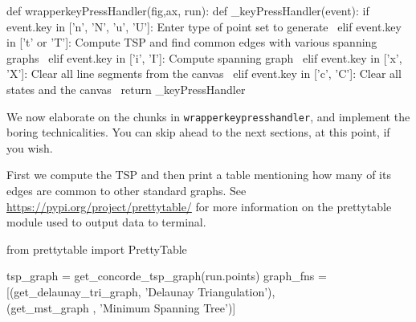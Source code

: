 \nwenddocs{}\plusendmoddef\nwstartdeflinemarkup{}\nwenddeflinemarkup
def wrapperkeyPressHandler(fig,ax, run): 
       def _keyPressHandler(event):
               if event.key in ['n', 'N', 'u', 'U']: 
                     \LA{}Enter type of point set to generate~{\nwtagstyle{}}\RA{}                   
               elif event.key in ['t' or 'T']:
                     \LA{}Compute TSP and find common edges with various spanning graphs~{\nwtagstyle{}}\RA{}
               elif event.key in ['i', 'I']:                     
                     \LA{}Compute spanning graph~{\nwtagstyle{}}\RA{}    
               elif event.key in ['x', 'X']:
                     \LA{}Clear all line segments from the canvas~{\nwtagstyle{}}\RA{}
               elif event.key in ['c', 'C']: 
                     \LA{}Clear all states and the canvas~{\nwtagstyle{}}\RA{}
       return _keyPressHandler
\nwendcode{}\nwdocspar

We now elaborate on the chunks in \verb|wrapperkeypresshandler|, and implement the boring technicalities. You 
can skip ahead to the next sections, at this point, if you wish. 

First we compute the TSP and then print a table mentioning how many of its edges are common to other
standard graphs. See \url{https://pypi.org/project/prettytable/} for more information on the 
prettytable module used to output data to terminal. 


\nwenddocs{}\plusendmoddef\nwstartdeflinemarkup{}\nwenddeflinemarkup
from prettytable import PrettyTable
\nwendcode{}\nwdocspar


\nwenddocs{}\endmoddef\nwstartdeflinemarkup{}\nwenddeflinemarkup
tsp_graph = get_concorde_tsp_graph(run.points)
graph_fns = [(get_delaunay_tri_graph, 'Delaunay Triangulation'), \\
             (get_mst_graph         , 'Minimum Spanning Tree')]

